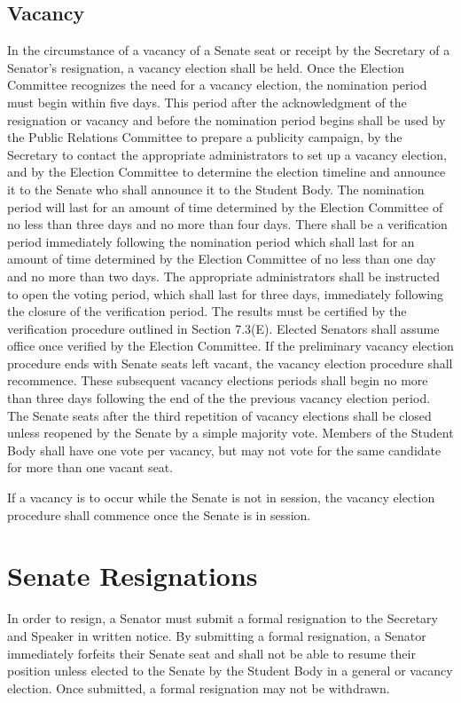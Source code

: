 \documentclass[12pt]{scrreprt}
\begin{document}
\subsection{Vacancy}
In the circumstance of a vacancy of a Senate seat or receipt by the Secretary of a
Senator’s resignation, a vacancy election shall be held. Once the Election
Committee recognizes the need for a vacancy election, the nomination period must
begin within five days. This period after the acknowledgment of the resignation or
vacancy and before the nomination period begins shall be used by the Public
Relations Committee to prepare a publicity campaign, by the Secretary to contact
the appropriate administrators to set up a vacancy election, and by the Election
Committee to determine the election timeline and announce it to the Senate who
shall announce it to the Student Body. The nomination period will last for an
amount of time determined by the Election Committee of no less than three days
and no more than four days. There shall be a verification period immediately following the nomination period which shall last for an amount of time determined
by the Election Committee of no less than one day and no more than two days. The
appropriate administrators shall be instructed to open the voting period, which shall
last for three days, immediately following the closure of the verification period.
The results must be certified by the verification procedure outlined in Section
7.3(E). Elected Senators shall assume office once verified by the Election
Committee. If the preliminary vacancy election procedure ends with Senate seats left vacant,
the vacancy election procedure shall recommence. These subsequent vacancy
elections periods shall begin no more than three days following the end of the the
previous vacancy election period. The Senate seats after the third
repetition of vacancy elections shall be closed unless reopened by the Senate by a simple majority vote. Members of the Student Body shall have one vote
per vacancy, but may not vote for the same candidate for more than one vacant
seat.

If a vacancy is to occur while the Senate is not in session, the vacancy election
procedure shall commence once the Senate is in session.

\section{Senate Resignations}
In order to resign, a Senator must submit a formal resignation to the Secretary and
Speaker in written notice. By submitting a formal resignation, a Senator immediately forfeits their Senate seat and shall not be able to resume their position
unless elected to the Senate by the Student Body in a general or vacancy election. Once submitted, a formal resignation may not be withdrawn.
\end{document}
